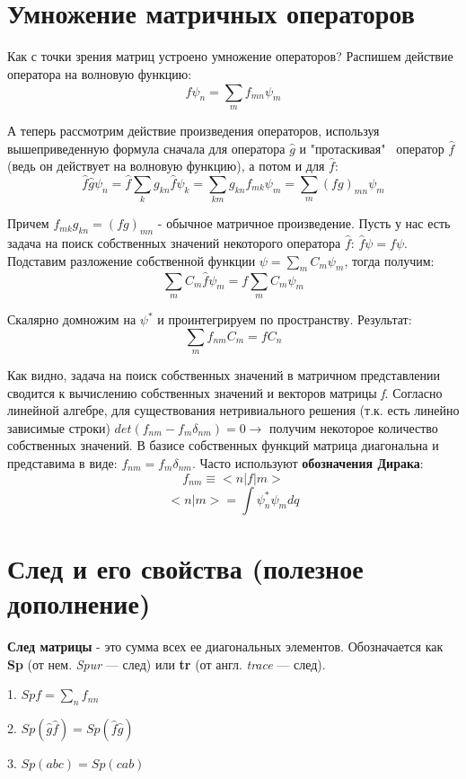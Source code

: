 \section{Умножение матричных операторов}
\par Как с точки зрения матриц устроено умножение операторов? Распишем действие оператора на волновую функцию:
$$\hat{f} \psi_n = \sum_{m} f_{mn}\psi_{m}$$
\par А теперь рассмотрим действие произведения операторов, используя вышеприведенную формула сначала для оператора $\hat{g}$ и "протаскивая" \, оператор $\hat{f}$ (ведь он действует на волновую функцию), а потом и для $\hat{f}$:
$$\hat{f} \hat{g}\psi_n = \hat{f} \sum_k g_{kn}\hat{f}\psi_k = \sum_{km}g_{kn}f_{mk}\psi_m = \sum_m (fg)_{mn} \psi_m$$
\par Причем $f_{mk}g_{kn} = (fg)_{mn}$ - обычное матричное произведение. Пусть у нас есть задача на поиск собственных значений некоторого оператора $\hat{f}$: $\hat{f}\psi = f\psi$. Подставим разложение собственной функции $\psi = \sum_m C_m \psi_m$, тогда получим:
$$\sum_m C_m \hat{f} \psi_m = f \sum_{m}C_m \psi_m$$
\par Скалярно домножим на $\psi^*$ и проинтегрируем по пространству. Результат: 
$$ \sum_m f_{nm} C_m = f C_n$$
\par Как видно, задача на поиск собственных значений в матричном представлении сводится к вычислению собственных значений и векторов матрицы \textit{f}. Согласно линейной алгебре, для существования нетривиального решения (т.к. есть линейно зависимые строки)
 $det(f_{nm}-f_m\delta_{nm})=0 \rightarrow $ получим некоторое количество собственных значений. В базисе собственных функций матрица диагональна и представима в виде:  $f_{nm}=f_m\delta_{nm} $. Часто используют \textbf{обозначения Дирака}:
$$ f_{nm} \equiv < n|f|m> $$
$$ <n|m> = \int \psi^*_n \psi_m dq $$
\section{След и его свойства (полезное дополнение)}
\par \textbf{След матрицы} - это сумма всех ее диагональных элементов. Обозначается как \textbf{Sp} (от нем. \textit{Spur} — след) или \textbf{tr} (от англ. \textit{trace} — след).
\par 1\textdegree. $Spf=\sum_n f_{nn}$
\par 2\textdegree. $Sp(\hat{g}\hat{f})=Sp(\hat{f}\hat{g})$
\par 3\textdegree. $Sp(abc)=Sp(cab)$
